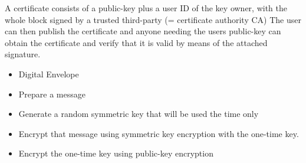 \documentclass[../CIT288SecurityResearchNotebook.tex]{subfiles}
\begin{document}

A certificate consists of a public-key plus a user ID of the key owner, with the whole block signed by a trusted
	third-party (= certificate authority CA) The user can then publish the certificate and anyone needing the users
	public-key can obtain the certificate and verify that it is valid by means of the attached signature.


\begin{itemize}
	\item Digital Envelope
	\item Prepare a message
	\item Generate a random symmetric key that will be used the time only
	\item Encrypt that message using symmetric key encryption with the one-time key. 
	\item Encrypt the one-time key using public-key encryption
\end{itemize}
\end{document}
